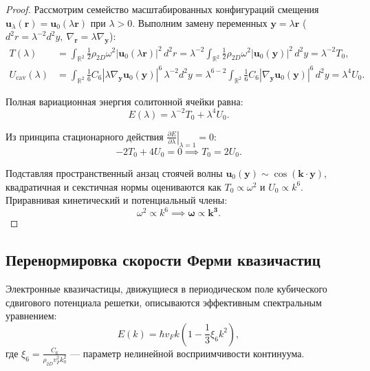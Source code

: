 \documentclass[12pt,a4paper]{article}
\begin{document}
	\begin{proof}
		Рассмотрим семейство масштабированных конфигураций смещения $\mathbf{u}_\lambda(\mathbf{r}) = \mathbf{u}_0(\lambda \mathbf{r})$ при $\lambda > 0$. Выполним замену переменных $\mathbf{y} = \lambda \mathbf{r}$ ($d^2r = \lambda^{-2} d^2y, \ \nabla_\mathbf{r} = \lambda \nabla_\mathbf{y}$):
		\begin{align}
			T(\lambda) &= \int_{\mathbb{R}^2} \frac{1}{2} \rho_{2D} \omega^2 |\mathbf{u}_0(\lambda \mathbf{r})|^2 \, d^2r = \lambda^{-2} \int_{\mathbb{R}^2} \frac{1}{2} \rho_{2D} \omega^2 |\mathbf{u}_0(\mathbf{y})|^2 \, d^2y = \lambda^{-2} T_0, \\
			U_{\text{cav}}(\lambda) &= \int_{\mathbb{R}^2} \frac{1}{6} C_6 |\lambda \nabla_\mathbf{y} \mathbf{u}_0(\mathbf{y})|^6 \, \lambda^{-2} d^2y = \lambda^{6-2} \int_{\mathbb{R}^2} \frac{1}{6} C_6 |\nabla_\mathbf{y} \mathbf{u}_0(\mathbf{y})|^6 \, d^2y = \lambda^4 U_0.
		\end{align}
		
		Полная вариационная энергия солитонной ячейки равна:
		\begin{equation}
			E(\lambda) = \lambda^{-2} T_0 + \lambda^4 U_0.
		\end{equation}
		
		Из принципа стационарного действия $\left. \frac{\partial E}{\partial \lambda} \right|_{\lambda=1} = 0$:
		\begin{equation}
			-2 T_0 + 4 U_0 = 0 \implies T_0 = 2 U_0.
		\end{equation}
		
		Подставляя пространственный анзац стоячей волны $\mathbf{u}_0(\mathbf{y}) \sim \cos(\mathbf{k} \cdot \mathbf{y})$, квадратичная и секстичная нормы оцениваются как $T_0 \propto \omega^2$ и $U_0 \propto k^6$. Приравнивая кинетический и потенциальный члены:
		\begin{equation}
			\omega^2 \propto k^6 \implies \mathbf{\omega \propto k^3}.
		\end{equation}
	\end{proof}
	
	\subsection{Перенормировка скорости Ферми квазичастиц}
	Электронные квазичастицы, движущиеся в периодическом поле кубического сдвигового потенциала решетки, описываются эффективным спектральным уравнением:
	\begin{equation}
		E(k) = \hbar v_F k \left( 1 - \frac{1}{3} \xi_6 k^2 \right),
	\end{equation}
	где $\xi_6 = \frac{C_6}{\rho_{2D} v_F^2 k_0^2}$ — параметр нелинейной восприимчивости континуума.
	
\end{document}
